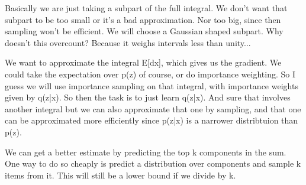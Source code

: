 Basically we are just taking a subpart of the full integral. We don't want that subpart to be too small or it's a bad approximation. Nor too big, since then sampling won't be efficient. We will choose a Gaussian shaped subpart. Why doesn't this overcount? Because it weighs intervals less than unity...


We want to approximate the integral E[dx], which gives us the gradient. We could take the expectation over p(z) of course, or do importance weighting. So I guess we will use importance sampling on that integral, with importance weights given by q(z|x). So then the task is to just learn q(z|x). And sure that involves another integral but we can also approximate that one by sampling, and that one can be approximated more efficiently since p(z|x) is a narrower distribtuion than p(z).


We can get a better estimate by predicting the top k components in the sum. One way to do so cheaply is predict a distribution over components and sample k items from it. This will still be a lower bound if we divide by k.


